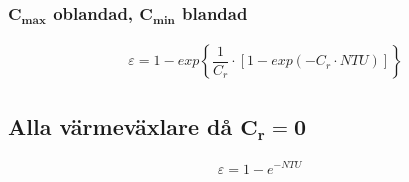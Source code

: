 	\subsubsection*{$\mathbf{C_{max}}$ oblandad, $\mathbf{C_{min}}$ blandad}
	\begin{align*}
	& \varepsilon = 1- exp\left\{ \dfrac{1}{C_r} \cdot [1 - exp(-C_r \cdot NTU)]\right\}
	\end{align*}
	\subsection*{Alla värmeväxlare då $\mathbf{C_r = 0}$}
	\begin{align*}
		\varepsilon = 1 - e^{-NTU}
	\end{align*}

